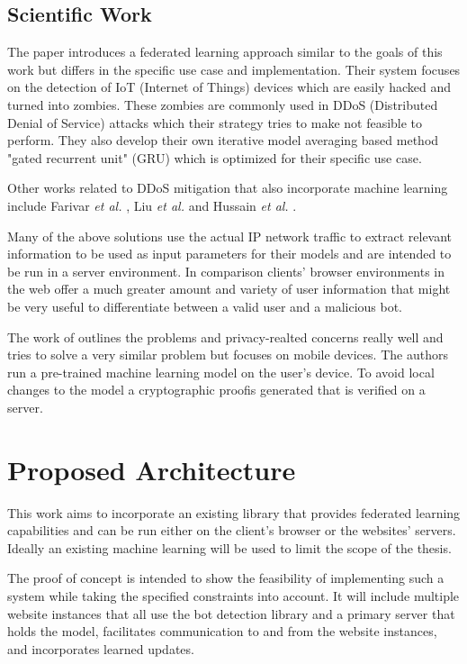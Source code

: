 \documentclass[
    fontsize=12pt,
    headings=small,
    parskip=half,           %
    bibliography=totoc,
    numbers=noenddot,       %
    open=any,               %
    ]{scrreprt}
\begin{document}
\section{Scientific Work}

The paper \cite{LiJi2021} introduces a federated learning approach similar to the goals of this work but differs in the specific use case and implementation. Their system focuses on the detection of IoT (Internet of Things) devices which are easily hacked and turned into zombies. These zombies are commonly used in DDoS (Distributed Denial of Service) attacks which their strategy tries to make not feasible to perform. They also develop their own iterative model averaging based method "gated recurrent unit" (GRU) which is optimized for their specific use case.

Other works related to DDoS mitigation that also incorporate machine learning include Farivar \emph{et al.} \cite{FaFa2020}, Liu \emph{et al.} \cite{8594641} and Hussain \emph{et al.} \cite{9000893}.

Many of the above solutions use the actual IP network traffic to extract relevant information to be used as input parameters for their models and are intended to be run in a server environment. In comparison clients' browser environments in the web offer a much greater amount and variety of user information that might be very useful to differentiate between a valid user and a malicious bot.

The work of \cite{PETS2021} outlines the problems and privacy-realted concerns really well and tries to solve a very similar problem but focuses on mobile devices. The authors run a pre-trained machine learning model on the user's device. To avoid local changes to the model a cryptographic proofis generated that is verified on a server.



\iffalse %

\chapter{Proposed Architecture}

This work aims to incorporate an existing library that provides federated learning capabilities and can be run either on the client's browser or the websites' servers. Ideally an existing machine learning will be used to limit the scope of the thesis.

The proof of concept is intended to show the feasibility of implementing such a system while taking the specified constraints into account. It will include multiple website instances that all use the bot detection library and a primary server that holds the model, facilitates communication to and from the website instances, and incorporates learned updates.
\end{document}
